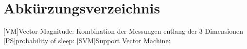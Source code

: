 \chapter{Abkürzungsverzeichnis}
\begin{acronym} 
    [VM]{Vector Magnitude: Kombination der Messungen entlang der 3 Dimensionen}
    [PS]{probability of sleep:}
    [SVM]{Support Vector Machine: }
\end{acronym}